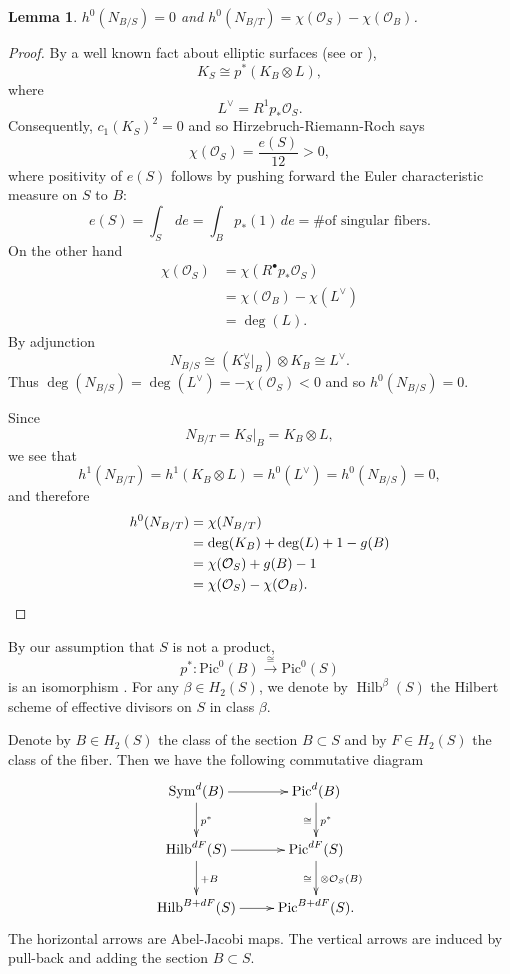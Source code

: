 \documentclass[12pt]{amsart}
\newtheorem{lemma}[theorem]{Lemma}
\theoremstyle{definition}
\renewcommand{\O}{\mathcal{O}}
\newcommand{\Pic}{\mathrm{Pic}}
\newcommand{\Sym}{\operatorname{Sym}}
\newcommand{\Hilb}{\operatorname{Hilb}}
\begin{document}
\begin{lemma}\label{lem: h0 of normal bundles of B in S and T}
$h^{0}(N_{B/S})=0$ and $h^{0}(N_{B/T})=\chi (\O_{S})-\chi (\O_{B})$. 
\end{lemma}
\begin{proof}
By a well known fact about elliptic surfaces (see \cite{Fr-Mo} or
\cite[III.1.1]{Miranda}),
\[
K_{S}\cong p^{*}(K_{B}\otimes L),
\]
where
\[
L^{\vee} = R^{1}p_{*}\O_{S}.
\]
Consequently, $c_{1}(K_{S})^{2}=0$ and so Hirzebruch-Riemann-Roch says
\[
\chi (\O_{S}) = \frac{e(S)}{12}>0,
\]
where positivity of $e(S)$ follows by pushing forward the Euler
characteristic measure on $S$ to $B$:
\[
e(S) = \int_{S}\, de =  \int_{B} p_{*}(1)\,de = \text{\# of singular fibers.}
\]
On the other hand
\begin{align*}
\chi (\O_{S})& = \chi (R^{\bullet}p_{*}\O_{S})\\
&=\chi (\O_{B}) - \chi (L^{\vee})\\
&=\deg (L). 
\end{align*}
By adjunction
\[
N_{B/S} \cong (K_{S}^{\vee}|_{B})\otimes K_{B} \cong L^{\vee}.
\]
Thus $\deg (N_{B/S})=\deg (L^{\vee})=-\chi (\O_{S})<0$ and so
$h^{0}(N_{B/S})=0$.

Since 
\[
N_{B/T} = K_{S}|_{B} = K_{B}\otimes L,
\]
we see that
\[
h^{1}(N_{B/T}) = h^{1}(K_{B}\otimes L) = h^{0}(L^{\vee}) =
h^{0}(N_{B/S}) = 0,
\]
and therefore
\begin{align*}
h^{0}(N_{B/T})& = \chi (N_{B/T})\\
&=\deg (K_{B}) +\deg (L)+1-g(B)\\
&=\chi (\O_{S})+g(B)-1\\
&=\chi (\O_{S}) - \chi (\O_{B}). \qedhere
\end{align*}
\end{proof}






By our assumption that $S$ is not a product, 
$$
p^* : \Pic^0(B) \stackrel{\cong}{\longrightarrow} \Pic^0(S)
$$
is an isomorphism \cite[VII.1.1]{Miranda}. For any $\beta \in H_2(S)$,
we denote by $\Hilb^\beta(S)$ the Hilbert scheme of effective divisors
on $S$ in class $\beta$.

Denote by $B \in H_2(S)$ the class of the section $B \subset S$ and by $F \in H_2(S)$ the class of the fiber. Then we have the following commutative diagram 
\begin{displaymath}
\xymatrix
{
\Sym^d(B) \ar[d]^{p^*} \ar[r] & \Pic^d(B) \ar[d]^{p^*}_{\cong} \\
\Hilb^{dF}(S) \ar[d]^{+B} \ar[r] & \Pic^{dF}(S) \ar[d]^{\otimes \O_S(B)}_{\cong} \\
\Hilb^{B+dF}(S) \ar[r] & \Pic^{B+dF}(S). 
}
\end{displaymath}
The horizontal arrows are Abel-Jacobi maps. The vertical arrows are
induced by pull-back and adding the section $B \subset S$.
\end{document}
